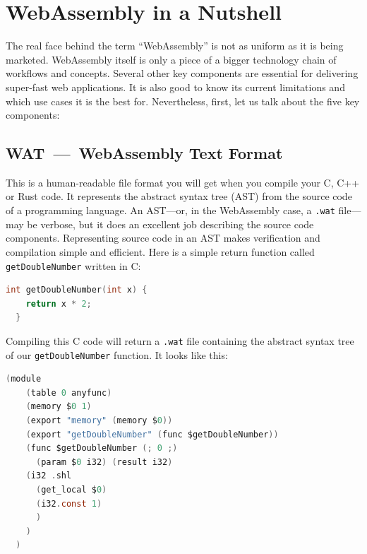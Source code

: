 \documentclass[10pt]{article}
\begin{document}
\begin{sloppypar}
  \section{WebAssembly in a Nutshell}
  \label{sec:wasm-in-a-nutshell}

  The real face behind the term “WebAssembly” is not as uniform as it is being marketed. WebAssembly itself is only a piece of a bigger technology chain of workflows and concepts. Several other key components are essential for delivering super-fast web applications. It is also good to know its current limitations and which use cases it is the best for. Nevertheless, first, let us talk about the five key components:

  \subsection{WAT~—~WebAssembly Text Format}
  \label{sec:webassembly-text-format}

  This is a human-readable file format you will get when you compile your C, C++ or Rust code. It represents the abstract syntax tree (AST) from the source code of a programming language. An AST—or, in the WebAssembly case, a \lstinline{.wat} file—may be verbose, but it does an excellent job describing the source code components. Representing source code in an AST makes verification and compilation simple and efficient. Here is a simple return function called \lstinline{getDoubleNumber} written in C:

  \vspace{7pt}
  \begin{lstlisting}[language=C, caption=Code example in C., label=lst:c-example]
  int getDoubleNumber(int x) {
    return x * 2;
  }\end{lstlisting}

  Compiling this C code will return a \lstinline{.wat} file containing the abstract syntax tree of our \lstinline{getDoubleNumber} function. It looks like this:

  \vspace{7pt}
  \begin{lstlisting}[language=C, caption=Code example from above compiled into the WebAssembly Text Format., label=lst:wat-example]
  (module
    (table 0 anyfunc)
    (memory $0 1)
    (export "memory" (memory $0))
    (export "getDoubleNumber" (func $getDoubleNumber))
    (func $getDoubleNumber (; 0 ;)
      (param $0 i32) (result i32)
    (i32 .shl
      (get_local $0)
      (i32.const 1)
      )
    )
  )\end{lstlisting}


\end{sloppypar}
\end{document}

